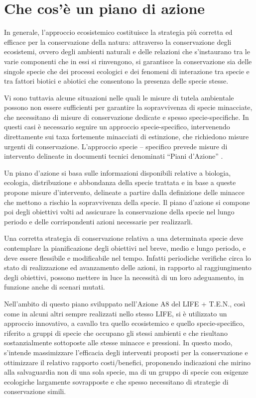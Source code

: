 \documentclass[10pt,twoside,openany,x11names,svgnames,italian,a5paper,dvipsnames,table]{memoir}
\newcommand\chapterillustration{}
\begin{document}
\chapter{Che cos'\`e un piano di azione}
\renewcommand\chapterillustration{}
\footnotesize
\vspace{.5cm}
In generale, l'approccio ecosistemico costituisce la strategia più corretta ed efficace per la conservazione della natura: attraverso la conservazione degli ecosistemi, ovvero degli ambienti naturali e delle relazioni che s’instaurano tra le varie componenti che in essi si rinvengono, si garantisce la conservazione sia delle singole specie che dei processi ecologici e dei fenomeni di interazione tra specie e tra fattori biotici e abiotici che consentono la presenza delle specie stesse.

Vi sono tuttavia alcune situazioni nelle quali le misure di tutela ambientale possono non essere sufficienti per garantire la sopravvivenza di specie minacciate, che necessitano di misure di conservazione dedicate e spesso specie-specifiche. In questi casi è necessario seguire un approccio specie-specifico, intervenendo direttamente sui taxa fortemente minacciati di estinzione, che richiedono misure urgenti di conservazione. L’approccio specie – specifico prevede misure di intervento delineate in documenti tecnici denominati “Piani d’Azione” \cite{EUCOUNCIL98}.

Un piano d’azione si basa sulle informazioni disponibili relative a biologia, ecologia, distribuzione e abbondanza della specie trattata e in base a queste propone misure d’intervento, delineate a partire dalla definizione delle minacce che mettono a rischio la sopravvivenza della specie. Il piano d’azione si compone poi degli obiettivi volti ad assicurare la conservazione della specie nel lungo periodo e delle corrispondenti azioni necessarie per realizzarli.

Una corretta strategia di conservazione relativa a una determinata specie deve contemplare la pianificazione degli obiettivi nel breve, medio e lungo periodo, e deve essere flessibile e modificabile nel tempo. Infatti periodiche verifiche circa lo stato di realizzazione ed avanzamento delle azioni, in rapporto al raggiungimento degli obiettivi, possono mettere in luce la necessità di un
loro adeguamento, in funzione anche di scenari mutati.

Nell'ambito di questo piano sviluppato nell'Azione A8 del LIFE + T.E.N., così come in alcuni altri sempre realizzati nello stesso LIFE, si è utilizzato un approccio innovativo, a cavallo tra quello ecosistemico e quello specie-specifico, riferito a gruppi di specie che occupano gli stessi ambienti e che risultano sostanzialmente sottoposte alle stesse minacce e pressioni. In questo modo, s’intende massimizzare l'efficacia degli interventi proposti per la conservazione e ottimizzare il relativo rapporto costi/benefici, proponendo indicazioni che mirino alla salvaguardia non di una sola specie, ma di un gruppo di specie con esigenze ecologiche largamente sovrapposte e che spesso necessitano di strategie di conservazione simili.\\ 
\end{document}
